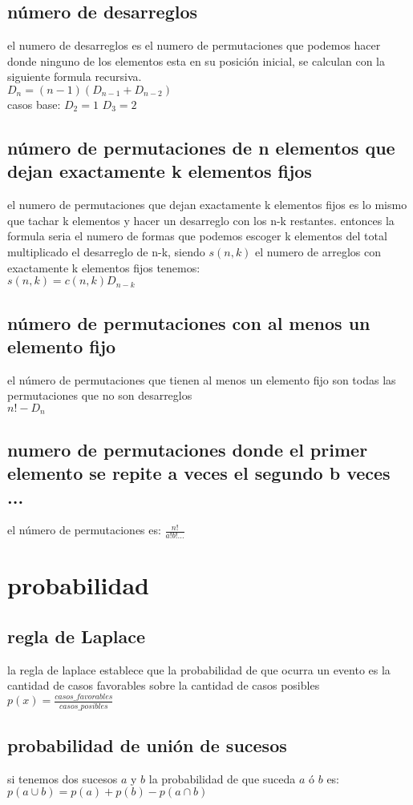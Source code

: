 \documentclass[11pt,a4paper]{book}
\begin{document}
\subsection{número de desarreglos}
el numero de desarreglos es el numero de permutaciones que podemos hacer donde ninguno de los elementos esta en su posición inicial, se calculan con la siguiente formula recursiva.\\
$D_{n}=(n-1)(D_{n-1}+D_{n-2})$\\
casos base:
$D_{2}=1$ $D_{3}=2$
\subsection{número de permutaciones de n elementos que dejan exactamente k elementos fijos}
el numero de permutaciones que dejan exactamente k elementos fijos es lo mismo que tachar k elementos y hacer un desarreglo con los n-k restantes. entonces la formula seria el numero de formas que podemos escoger k elementos del total multiplicado el desarreglo de n-k, siendo $s(n,k)$ el numero de arreglos con exactamente k elementos fijos tenemos:\\
$s(n,k)=c(n,k)D_{n-k}$

\subsection{número de permutaciones con al menos un elemento fijo}
el número de permutaciones que tienen al menos un elemento fijo son todas las permutaciones que no son desarreglos\\
$n!-D_{n}$
\subsection{numero de permutaciones donde el primer elemento se repite a veces el segundo b veces ...}
el número de permutaciones es:
$\frac{n!}{a!b!...}$
\section{probabilidad}
\subsection{regla de Laplace}
la regla de laplace establece que la probabilidad de que ocurra un evento es la cantidad de casos favorables sobre la cantidad de casos posibles\\
$p(x)=\frac{casos\_favorables}{casos\_posibles}$
\subsection{probabilidad de unión de sucesos}
si tenemos dos sucesos $a$ y $b$ la probabilidad de que suceda $a$ ó $b$ es:
$p(a\cup b)=p(a)+p(b)-p(a\cap b)$
\end{document}
